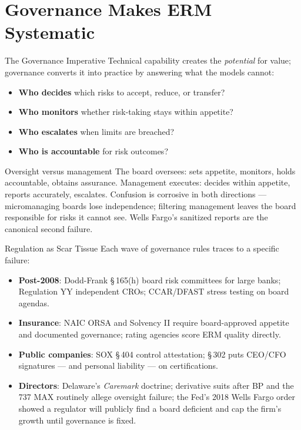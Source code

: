 \documentclass[11pt, aspectratio=169]{beamer}
\begin{document}
\section{Governance Makes ERM Systematic}

\begin{frame}{The Governance Imperative}
Technical capability creates the \emph{potential} for value; governance converts it into practice by answering what the models cannot:
\begin{itemize}
  \item \textbf{Who decides} which risks to accept, reduce, or transfer?
  \item \textbf{Who monitors} whether risk-taking stays within appetite?
  \item \textbf{Who escalates} when limits are breached?
  \item \textbf{Who is accountable} for risk outcomes?
\end{itemize}
\medskip
\begin{block}{Oversight versus management}
The board \alert{oversees}: sets appetite, monitors, holds accountable, obtains assurance. Management \alert{executes}: decides within appetite, reports accurately, escalates. Confusion is corrosive in both directions --- micromanaging boards lose independence; filtering management leaves the board responsible for risks it cannot see. Wells Fargo's sanitized reports are the canonical second failure.
\end{block}
\end{frame}

\begin{frame}{Regulation as Scar Tissue}
Each wave of governance rules traces to a specific failure:
\begin{itemize}
  \item \textbf{Post-2008}: Dodd-Frank \S\,165(h) board risk committees for large banks; Regulation YY independent CROs; CCAR/DFAST stress testing on board agendas.
  \item \textbf{Insurance}: NAIC ORSA and Solvency II require board-approved appetite and documented governance; rating agencies score ERM quality directly.
  \item \textbf{Public companies}: SOX \S\,404 control attestation; \S\,302 puts CEO/CFO signatures --- and personal liability --- on certifications.
  \item \textbf{Directors}: Delaware's \emph{Caremark} doctrine; derivative suits after BP and the 737 MAX routinely allege oversight failure; the Fed's 2018 Wells Fargo order showed a regulator will publicly find a board deficient and \alert{cap the firm's growth} until governance is fixed.
\end{itemize}
\end{frame}
\end{document}
